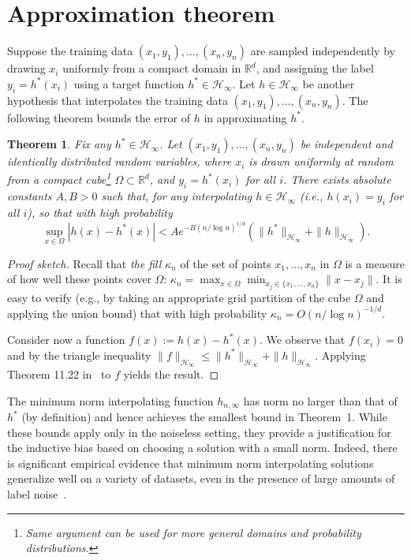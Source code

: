 \documentclass[11pt]{article}
\newtheorem{theorem}{Theorem}
\newcommand{\R}{{\mathbb{R}}}
\newcommand{\rkhs}{{\mathcal{H_\infty}}}
\newcommand\optninf{h_{n,\infty}}
\begin{document}


\appendix

\section{Approximation theorem}
\label{app:approx}

Suppose the training data $(x_1,y_1), \dotsc, (x_n,y_n)$ are sampled independently by drawing $x_i$ uniformly from a compact domain in $\R^d$, and assigning the label $y_i = h^*(x_i)$ using a target function $h^* \in \rkhs$.
Let $h \in \rkhs$ be another hypothesis that interpolates the training data $(x_1,y_1),\dotsc,(x_n,y_n)$.
The following theorem bounds the error of $h$ in approximating $h^*$.
\begin{theorem}
  \label{thm:wendland}
  Fix any $h^* \in \rkhs$.
  Let $(x_1,y_1),\dotsc,(x_n,y_n)$ be independent and identically distributed random variables, where $x_i$ is drawn uniformly at random from a compact cube\footnote{Same argument can be used for more general domains and probability distributions.} $\Omega \subset \R^d$, and $y_i = h^*(x_i)$ for all $i$.
  There exists absolute constants $A, B > 0$ such that, for any interpolating $h \in \rkhs$ (i.e., $h(x_i) = y_i$ for all $i$), so that with high probability
  \[
    \sup_{x \in \Omega} |h(x) - h^*(x)| < Ae^{-B(n/\log n)^{1/d}}\left(\|h^*\|_\rkhs + \|h\|_\rkhs \right) .
  \]
\end{theorem}
\begin{proof}[Proof sketch]
Recall that {\it the fill} $\kappa_n$ of the set of points $x_1,\ldots,x_n$ in $\Omega$ is a measure of how well these points cover $\Omega$: $\kappa_n = \max_{x \in \Omega} \min_{x_j \in \{x_1,\ldots,x_n\}} \|x - x_j\|$. It is easy to verify (e.g., by taking an appropriate grid partition of the cube $\Omega$ and applying the union bound)  
that with high probability $\kappa_n = O(n / \log n)^{-1/d}$. 

Consider now a function $f(x) := h(x) - h^*(x)$. We observe that $f(x_i)=0$ and by the triangle inequality $\|f\|_\rkhs \le \|h^*\|_\rkhs + \|h\|_\rkhs$. Applying Theorem 11.22 in~\cite{wendland_2004} to $f$ yields the result. 
\end{proof}
The minimum norm interpolating function $\optninf$ has norm no larger than that of $h^*$ (by definition) and hence achieves the smallest bound in Theorem~1.
While these bounds apply only in the noiseless setting, they provide a justification for the inductive bias based on choosing a solution with a small norm.
Indeed, there is significant empirical evidence that minimum norm interpolating solutions generalize well on a variety of datasets, even in the presence of large amounts of label noise~\cite{belkin2018understand}.
\end{document}
